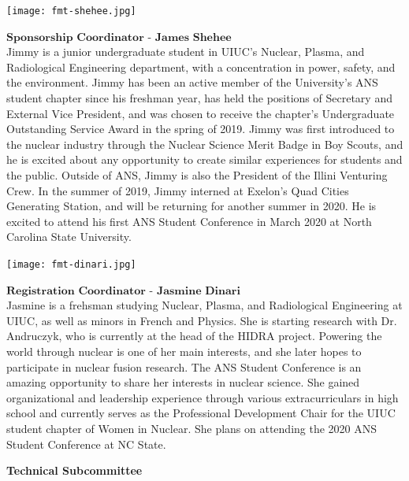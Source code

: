 \begin{minipage}{0.25\textwidth}
	\centering
	\texttt{[image: fmt-shehee.jpg]}
\end{minipage}
\begin{minipage}{0.73\textwidth}
	$\textbf{Sponsorship Coordinator - James Shehee}$\\
Jimmy is a junior undergraduate student in UIUC's Nuclear, Plasma, and Radiological Engineering department, with a concentration in power, safety, and the environment. Jimmy has been an active member of the University's ANS student chapter since his freshman year, has held the positions of Secretary and External Vice President, and was chosen to receive the chapter's Undergraduate Outstanding Service Award in the spring of 2019. Jimmy was first introduced to the nuclear industry through the Nuclear Science Merit Badge in Boy Scouts, and he is excited about any opportunity to create similar experiences for students and the public. Outside of ANS, Jimmy is also the President of the Illini Venturing Crew. In the summer of 2019, Jimmy interned at Exelon's Quad Cities Generating Station, and will be returning for another summer in 2020. He is excited to attend his first ANS Student Conference in March 2020 at North Carolina State University.
\end{minipage}

\begin{minipage}{0.25\textwidth}
	\centering
	\texttt{[image: fmt-dinari.jpg]}
\end{minipage}
\begin{minipage}{0.73\textwidth}
	$\textbf{Registration Coordinator - Jasmine Dinari}$\\
Jasmine is a frehsman studying Nuclear, Plasma, and Radiological Engineering at UIUC, as well as minors in French and Physics. She is starting research with Dr. Andruczyk, who is currently at the head of the HIDRA project. Powering the world through nuclear is one of her main interests, and she later hopes to participate in nuclear fusion research. The ANS Student Conference is an  amazing opportunity to share her interests in nuclear science. She gained organizational and leadership experience through various extracurriculars in high school and currently serves as the Professional Development Chair for the UIUC student chapter of Women in Nuclear. She plans on attending the 2020 ANS Student Conference at NC State.
\end{minipage}

\vspace{1cm}
\textbf{Technical Subcommittee}\\

